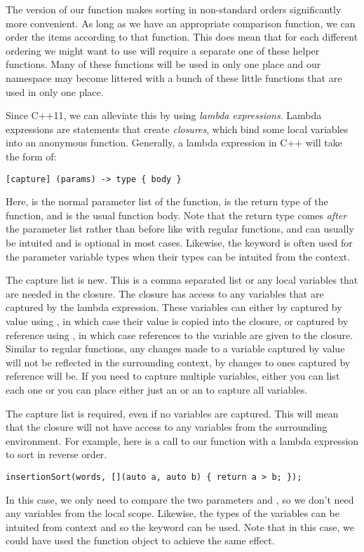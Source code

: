 The version of our  function makes sorting in non-standard orders significantly more convenient.
As long as we have an appropriate comparison function, we can order the items according to that function.
This does mean that for each different ordering we might want to use will require a separate one of these helper functions.
Many of these functions will be used in only one place and our namespace may become littered with a bunch of these little functions that are used in only one place.

Since C++11, we can alleviate this by using \emph{lambda expressions}.
Lambda expressions are statements that create \emph{closures}, which bind some local variables into an anonymous function.
Generally, a lambda expression in C++ will take the form of:
\begin{lstlisting}
[capture] (params) -> type { body }
\end{lstlisting}

Here,  is the normal parameter list of the function,  is the return type of the function, and  is the usual function body.
Note that the return type comes \emph{after} the parameter list rather than before like with regular functions, and can usually be intuited and is optional in most cases.
Likewise, the  keyword is often used for the parameter variable types when their types can be intuited from the context.

The capture list is new.
This is a comma separated list or any local variables that are needed in the closure.
The closure has access to any variables that are captured by the lambda expression.
These variables can either by captured by value using \code{=}, in which case their value is copied into the closure,
or captured by reference using \code{\&}, in which case references to the variable are given to the closure.
Similar to regular functions, any changes made to a variable captured by value will not be reflected in the surrounding context, by changes to ones captured by reference will be.
If you need to capture multiple variables, either you can list each one or you can place either just an \code{=} or an \code{\&} to capture all variables.

The capture list is required, even if no variables are captured.
This will mean that the closure will not have access to any variables from the surrounding environment.
For example, here is a call to our  function with a lambda expression to sort in reverse order.
\begin{lstlisting}
insertionSort(words, [](auto a, auto b) { return a > b; });
\end{lstlisting}
In this case, we only need to compare the two parameters  and , so we don't need any variables from the local scope.
Likewise, the types of the variables can be intuited from context and so the  keyword can be used.
Note that in this case, we could have used the  function object to achieve the same effect.
